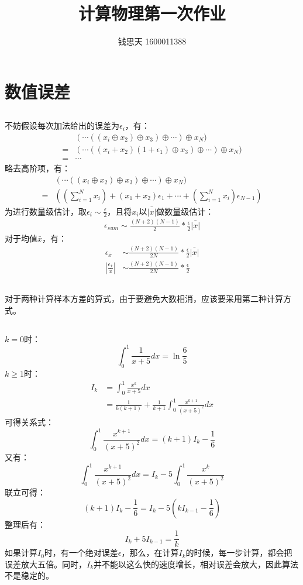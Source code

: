 \documentclass{ctexart}
\begin{document}
    \title{计算物理第一次作业}
    \author{钱思天 1600011388}
    \maketitle

    \section{数值误差}
    \subsection{}
    不妨假设每次加法给出的误差为$\epsilon_i$，有：
    \begin{align*}
        &(\cdots((x_i\oplus x_2)\oplus x_3)\oplus\cdots)\oplus x_N)\\
        =&(\cdots((x_i+ x_2)(1+\epsilon_1)\oplus x_3)\oplus\cdots)\oplus x_N)\\
        =&\cdots
    \end{align*}
    略去高阶项，有：
    \begin{align*}
        &(\cdots((x_i\oplus x_2)\oplus x_3)\oplus\cdots)\oplus x_N)\\
        =&((\sum_{i=1}^N{x_i})+(x_1+x_2)\epsilon_1+\cdots+(\sum_{i=1}^N{x_i})\epsilon_{N-1})
    \end{align*}
    为进行数量级估计，取$\epsilon_i\sim \frac{\epsilon}{2}$，且将$x_i$以$\bar{|x|}$做数量级估计：
    \begin{align*}
        \epsilon_{sum}\sim\frac{(N+2)(N-1)}{2}*\frac{\epsilon}{2}\bar{|x|}
    \end{align*}
    对于均值$\bar{x}$，有：
    \begin{align*}
        \epsilon_{\bar{x}}&\sim\frac{(N+2)(N-1)}{2N}*\frac{\epsilon}{2}\bar{|x|}\\
        |\frac{\epsilon_{\bar{x}}}{\bar{x}}|&\sim\frac{(N+2)(N-1)}{2N}*\frac{\epsilon}{2}
    \end{align*}
    \subsection{}
    对于两种计算样本方差的算式，由于要避免大数相消，应该要采用第二种计算方式。
    \subsection{}
    $k=0$时：
    $$\int_0^1\frac{1}{x+5}dx=\ln{\frac{6}{5}}$$
    $k\geq1$时：
    \begin{align*}
        I_k&=\int_0^1\frac{x^k}{x+5}dx\\
        &=\frac{1}{6(k+1)}+\frac{1}{k+1}\int_0^1\frac{x^{k+1}}{(x+5)^2}dx
    \end{align*}
    可得关系式：
    $$\int_0^1\frac{x^{k+1}}{(x+5)^2}dx=(k+1)I_k-\frac{1}{6}$$
    又有：
    $$\int_0^1\frac{x^{k+1}}{(x+5)^2}dx=I_k-5\int_0^1\frac{x^{k}}{(x+5)^2}$$
    联立可得：
    $$(k+1)I_k-\frac{1}{6}=I_k-5(kI_{k-1}-\frac{1}{6})$$
    整理后有：
    $$I_k+5I_{k-1}=\frac{1}{k}$$
    如果计算$I_0$时，有一个绝对误差$\epsilon$，那么，在计算$I_k$的时候，每一步计算，都会把误差放大五倍。同时，$I_k$并不能以这么快的速度增长，相对误差会放大，因此算法不是稳定的。
\end{document}
